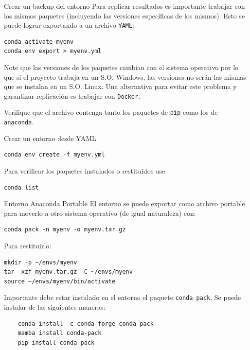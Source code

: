 \documentclass[presentation]{beamer}
\begin{document}
\begin{frame}[label={sec:org8f080ce},fragile]{Crear un backup del entorno}
 Para replicar resultados es importante trabajar con los mismos
paquetes (incluyendo las versiones específicas de los mismos). Esto se
puede lograr exportando a un archivo \texttt{YAML}:
\begin{verbatim}
conda activate myenv
conda env export > myenv.yml
\end{verbatim}

Note que las versiones de los paquetes cambian con el sistema
operativo por lo que si el proyecto trabaja en un S.O. Windows, las
versiones no serán las mismas que se instalan en un S.O. Linux. Una
alternativa para evitar este problema y garantizar replicación es
trabajar con \texttt{Docker}.

Verifique que el archivo contenga tanto los paquetes de \texttt{pip} como los
de \texttt{anaconda}. 
\end{frame}
\begin{frame}[label={sec:orgbc837b1},fragile]{Crear un entorno desde YAML}
 \begin{verbatim}
conda env create -f myenv.yml
\end{verbatim}
Para verificar los paquetes instalados o restituidos use
\begin{verbatim}
conda list
\end{verbatim}
\end{frame}
\begin{frame}{Entorno Anaconda Portable}
 El entorno se puede exportar como archivo portable para moverlo a otro
sistema operativo (de igual naturaleza) con:
\begin{verbatim}
conda pack -n myenv -o myenv.tar.gz
\end{verbatim}
Para restituirlo:
\begin{verbatim}
mkdir -p ~/envs/myenv
tar -xzf myenv.tar.gz -C ~/envs/myenv
source ~/envs/myenv/bin/activate
\end{verbatim}
\alert{\alert{Importante}} debe estar instalado en el entorno el paquete \texttt{conda
  pack}. Se puede instalar de las siguientes maneras:
\begin{verbatim}
    conda install -c conda-forge conda-pack
    mamba install conda-pack
    pip install conda-pack
\end{verbatim}
\end{frame}
\end{document}
